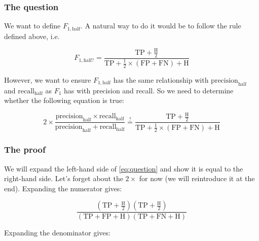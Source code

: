 \documentclass[12pt,letterpaper]{article}
\begin{document}
\subsubsection{The question}\label{sec:question}

We want to define $F_{1,\text{half}}$.
A natural way to do it would be to follow the rule defined above, i.e.

\begin{equation*}
    F_{1,\text{half?}} = \frac{\text{TP}+\frac{\text{H}}{2}}
            {\text{TP}+\frac{1}{2}\times(\text{FP}+\text{FN}) + \text{H}}
\end{equation*}

\noindent However, we want to ensure $F_{1,\text{half}}$ has the same relationship with $\text{precision}_{\text{half}}$ and $\text{recall}_{\text{half}}$ as $F_1$ has with precision and recall.
So we need to determine whether the following equation is true:

\begin{equation}\label{eq:question}
    2\times\frac{\text{precision}_{\text{half}}\times\text{recall}_{\text{half}}}
            {\text{precision}_{\text{half}} + \text{recall}_{\text{half}}}
    \stackrel{?}{=}
    \frac{\text{TP}+\frac{\text{H}}{2}}
            {\text{TP}+\frac{1}{2}\times(\text{FP}+\text{FN}) + \text{H}}
\end{equation}

\subsubsection{The proof}\label{sec:proof}

We will expand the left-hand side of \eqref{eq:question} and show it is equal to the right-hand side.
Let's forget about the $2\times$ for now (we will reintroduce it at the end).
Expanding the numerator gives:

\begin{equation*}
    \frac{\left(
        \text{TP}+\frac{\text{H}}{2}
    \right)\left(
        \text{TP}+\frac{\text{H}}{2}
    \right)}
    {\left(
        \text{TP} + \text{FP} + \text{H}
    \right)\left(
        \text{TP} + \text{FN} + \text{H}
    \right)}
\end{equation*}

\noindent Expanding the denominator gives:
\end{document}
